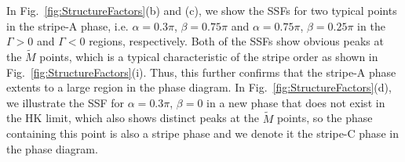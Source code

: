 \documentclass[aps,prb,reprint,amsfonts,amsmath,amssymb,showpacs,groupedaddress,superscriptaddress]{revtex4-1}
\begin{document}
In Fig.~\ref{fig:StructureFactors}(b) and (c), we show the SSFs for two typical points in the stripe-A phase, i.e. $\alpha=0.3\pi$, $\beta=0.75\pi$ and $\alpha=0.75\pi$, $\beta=0.25\pi$ in the $\Gamma>0$ and $\Gamma<0$ regions, respectively. Both of the SSFs show obvious peaks at the $\tilde{M}$ points, which is a typical characteristic of the stripe order as shown in Fig.~\ref{fig:StructureFactors}(i). Thus, this further confirms that the stripe-A phase extents to a large region in the phase diagram. In Fig.~\ref{fig:StructureFactors}(d), we illustrate the SSF for $\alpha=0.3\pi$, $\beta=0$ in a new phase that does not exist in the HK limit, which also shows distinct peaks at the $\tilde{M}$ points, so the phase containing this point is also a stripe phase and we denote it the stripe-C phase in the phase diagram.

\end{document}
